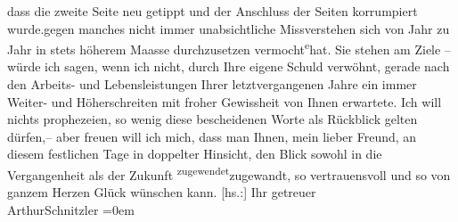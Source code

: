 \begin{ledgroupsized}[t]{13cm}
{{{               dass die zweite Seite neu getippt und der Anschluss der Seiten korrumpiert wurde.}}}\label{T_L02950-1h}{\pb}gegen
               manches nicht immer unabsichtliche Missverstehen sich von Jahr zu Jahr in stets
               höherem Maasse durchzusetzen vermocht\substVorne{}\textsuperscript{e}\substDazwischen{}{ }hat\substHinten{}. Sie stehen am Ziele – würde ich sagen, wenn ich nicht, durch Ihre eigene
               Schuld verwöhnt, gerade nach den Arbeits- und Lebensleistungen Ihrer letztvergangenen
               Jahre ein immer Weiter- und Höherschreiten mit froher Gewissheit von Ihnen erwartete.
               Ich will nichts prophezeien, so wenig diese bescheidenen Worte als Rückblick gelten
               dürfen,– aber freuen  will ich mich, dass man
               Ihnen, mein lieber Freund, an diesem festlichen Tage in doppelter Hinsicht, den Blick
               sowohl in die Vergangenheit als der Zukunft \substVorne{}\textsuperscript{zugewendet}{\allowbreak}\substDazwischen{}zugewandt\substHinten{}, so vertrauensvoll und so von ganzem Herzen Glück wünschen kann.\pend
           \pstart
           {[}hs.:{]} Ihr getreuer{\\[\baselineskip]}\spacefill\mbox{ArthurSchnitzler}\pend
           \leftskip=0em{}
         
         \endnumbering{}\end{ledgroupsized}  \newcommand{\dateiname}{L02950}\newcommand{\titel}{Arthur Schnitzler an Felix Salten, 29. 7. 1929}\newcommand{\editorInnen}{Martin Anton Müller und Laura Untner}
      